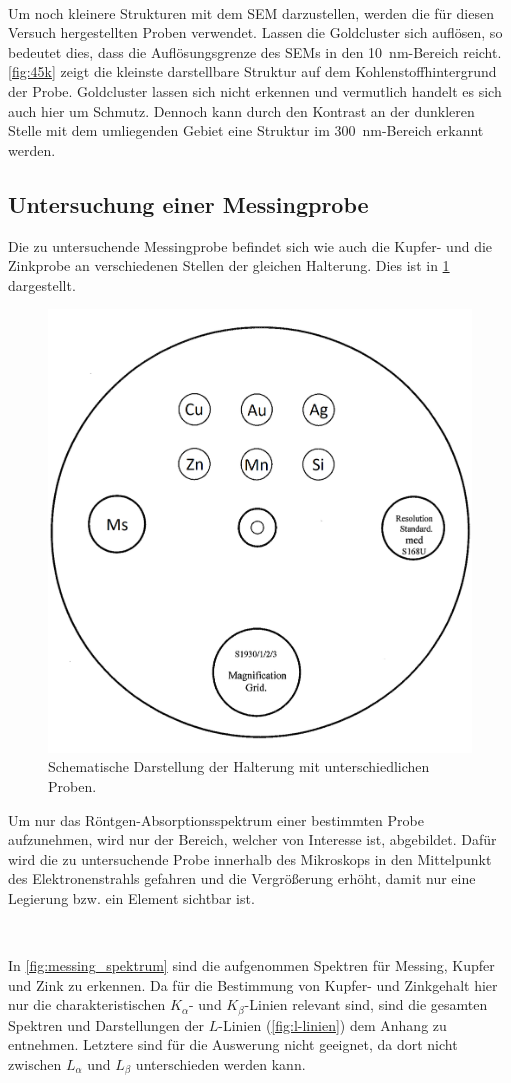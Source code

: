 	\

	Um noch kleinere Strukturen mit dem SEM darzustellen, werden die für diesen Versuch hergestellten Proben verwendet.
	Lassen die Goldcluster sich auflösen, so bedeutet dies, dass die Auflösungsgrenze des SEMs in den \SI{10}{\nano\meter}-Bereich reicht.
	\cref{fig:45k} zeigt die kleinste darstellbare Struktur auf dem Kohlenstoffhintergrund der Probe.
	Goldcluster lassen sich nicht erkennen und vermutlich handelt es sich auch hier um Schmutz.
	Dennoch kann durch den Kontrast an der dunkleren Stelle mit dem umliegenden Gebiet eine Struktur im \SI{300}{\nano\meter}-Bereich erkannt werden.


\subsection{Untersuchung einer Messingprobe}

	Die zu untersuchende Messingprobe befindet sich wie auch die Kupfer- und die Zinkprobe an verschiedenen Stellen der gleichen Halterung.
	Dies ist in \cref{fig:messing_halterung} dargestellt.
	\begin{figure}
		\centering
		\includegraphics[width=.4\textwidth]{img/Messingprobe}
		\caption{Schematische Darstellung der Halterung mit unterschiedlichen Proben.\cite{wwu}}
		\label{fig:messing_halterung}
	\end{figure}
	Um nur das Röntgen-Absorptionsspektrum einer bestimmten Probe aufzunehmen, wird nur der Bereich, welcher von Interesse ist, abgebildet.
	Dafür wird die zu untersuchende Probe innerhalb des Mikroskops in den Mittelpunkt des Elektronenstrahls gefahren und die Vergrößerung erhöht, damit nur eine Legierung bzw. ein Element sichtbar ist.

	\

	In \cref{fig:messing_spektrum} sind die aufgenommen Spektren für Messing, Kupfer und Zink zu erkennen.
	Da für die Bestimmung von Kupfer- und Zinkgehalt hier nur die charakteristischen $K_\alpha$- und $K_\beta$-Linien relevant sind, sind die gesamten Spektren und Darstellungen der $L$-Linien (\cref{fig:l-linien}) dem Anhang zu entnehmen.
	Letztere sind für die Auswerung nicht geeignet, da dort nicht zwischen $L_\alpha$ und $L_\beta$ unterschieden werden kann.

